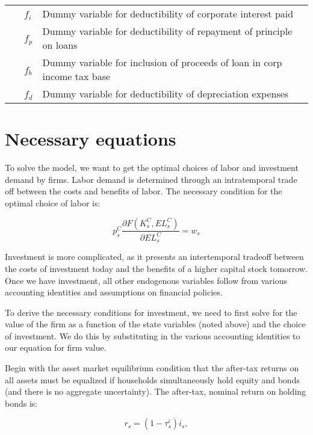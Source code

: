 \documentclass[article,11pt,letterpaper,fleqn]{article}
\theoremstyle{definition}
\numberwithin{equation}{section}
\begin{document}
\begin{table}[htbp]
\begin{tabular}{ll}
    \ \ \ $f_{i}$ & Dummy variable for deductibility of corporate interest paid \\
    \ \ \ $f_{p}$ & Dummy variable for deductibility of repayment of principle on loans \\
    \ \ \ $f_{b}$ & Dummy variable for inclusion of proceeds of loan in corp income tax base \\
    \ \ \ $f_{d}$ & Dummy variable for deductibility of depreciation expenses \\
    \hline
    \hline
    \end{tabular}%
  \label{tab:parameters}%
\end{table}%

\section{Necessary equations}
To solve the model, we want to get the optimal choices of labor and investment demand by firms.  Labor demand is determined through an intratemporal trade off between the costs and benefits of labor.  The necessary condition for the optimal choice of labor is: 

\begin{equation}
\label{eqn:foc_l}
p^{C}_{s}\frac{\partial F(K^{C}_{s},EL^{C}_{s})}{\partial EL^{C}_{s}}=w_{s}
\end{equation}

Investment is more complicated, as it presents an intertemporal tradeoff between the costs of investment today and the benefits of a higher capital stock tomorrow.  Once we have investment, all other endogenous variables follow from various accounting identities and assumptions on financial policies.

To derive the necessary conditions for investment, we need to first solve for the value of the firm as a function of the state variables (noted above) and the choice of investment. We do this by substituting in the various accounting identities to our equation for firm value.

Begin with the asset market equilibrium condition that the after-tax returns on all assets must be equalized if households simultaneously hold equity and bonds (and there is no aggregate uncertainty).  The after-tax, nominal return on holding bonds is:

\begin{equation}
\label{eqn:r}
r_{s}=(1-\tau^{i}_{s})i_{s},
\end{equation}
\end{document}
